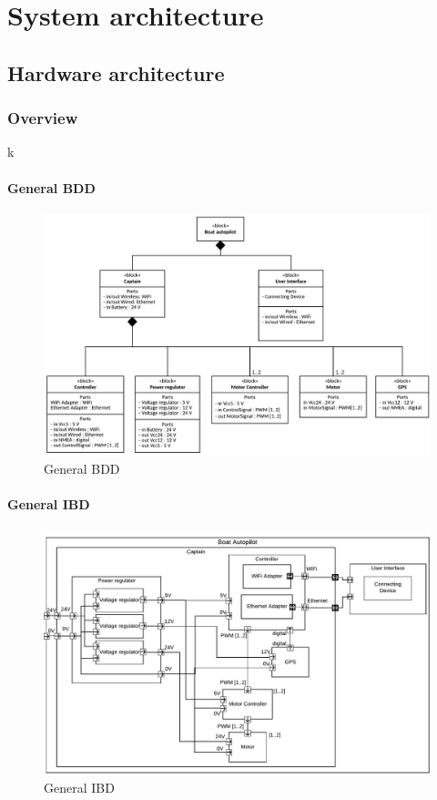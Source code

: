 \chapter{System architecture}

\section{Hardware architecture}
\subsection{Overview}
k

\subsubsection{General BDD}
\begin{figure}[H]
	\centering
	\includegraphics[width=1\linewidth]{Images/System_architecture/General_BDD}
	\caption{General BDD}
	\label{fig:generalbdd}
\end{figure}


\subsubsection{General IBD}
\begin{figure}[H]
	\centering
	\includegraphics[width=1\linewidth]{Images/System_architecture/General_IBD}
	\caption{General IBD}
	\label{fig:generalibd}
\end{figure}


